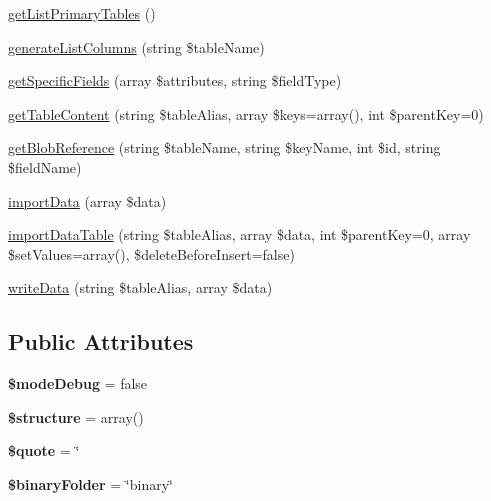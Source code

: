 \begin{DoxyCompactItemize}
\item 
\hyperlink{classExportModelProcessing_a92d950555aa256e6ef6ceb0a976e83e5}{get\+List\+Primary\+Tables} ()
\item 
\hyperlink{classExportModelProcessing_a66a3f33cd27c03c19b07f4074bab3cd8}{generate\+List\+Columns} (string \$table\+Name)
\item 
\hyperlink{classExportModelProcessing_a048a271e644dfa50549826dce12737bd}{get\+Specific\+Fields} (array \$attributes, string \$field\+Type)
\item 
\hyperlink{classExportModelProcessing_a788bed37275c67ecefa4b249a0f8910b}{get\+Table\+Content} (string \$table\+Alias, array \$keys=array(), int \$parent\+Key=0)
\item 
\hyperlink{classExportModelProcessing_a35cfd1e3beb5e7dc9a47d8cc262b2c93}{get\+Blob\+Reference} (string \$table\+Name, string \$key\+Name, int \$id, string \$field\+Name)
\item 
\hyperlink{classExportModelProcessing_ab64c8d4090ae54eb8b3a55853810b014}{import\+Data} (array \$data)
\item 
\hyperlink{classExportModelProcessing_a713672fd704e7044319586d7bda6e712}{import\+Data\+Table} (string \$table\+Alias, array \$data, int \$parent\+Key=0, array \$set\+Values=array(), \$delete\+Before\+Insert=false)
\item 
\hyperlink{classExportModelProcessing_a2038baafaded8f112fecf777792a3204}{write\+Data} (string \$table\+Alias, array \$data)
\end{DoxyCompactItemize}
\subsection*{Public Attributes}
\begin{DoxyCompactItemize}
\item 
\mbox{\label{classExportModelProcessing_a897c1e7cad4956ffd342ea962f687f21}} 
{\bfseries \$mode\+Debug} = false
\item 
\mbox{\label{classExportModelProcessing_a3a144b354537209ed78f6cf4428bc5cb}} 
{\bfseries \$structure} = array()
\item 
\mbox{\label{classExportModelProcessing_a3574016a0a223da71e37af1a73b5b1b2}} 
{\bfseries \$quote} = \textquotesingle{}\char`\"{}\textquotesingle{}
\item 
\mbox{\label{classExportModelProcessing_a67d1483753c4fa6b0543aceaf3664e51}} 
{\bfseries \$binary\+Folder} = \char`\"{}binary\char`\"{}
\end{DoxyCompactItemize}



